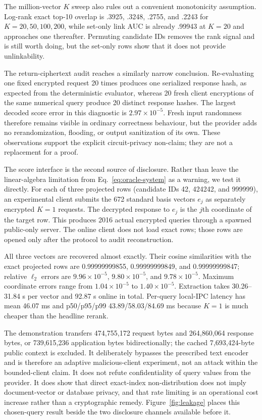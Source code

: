 \documentclass[pdflatex,sn-basic,Numbered]{sn-jnl}
\theoremstyle{plain}
\begin{document}
The million-vector $K$ sweep also rules out a convenient monotonicity assumption. Log-rank exact top-10 overlap is .3925, .3248, .2755, and .2243 for $K=20,50,100,200$, while set-only link AUC is already .99943 at $K=20$ and approaches one thereafter. Permuting candidate IDs removes the rank signal and is still worth doing, but the set-only rows show that it does not provide unlinkability.

The return-ciphertext audit reaches a similarly narrow conclusion. Re-evaluating one fixed encrypted request 20 times produces one serialized response hash, as expected from the deterministic evaluator, whereas 20 fresh client encryptions of the same numerical query produce 20 distinct response hashes. The largest decoded score error in this diagnostic is $2.97\times10^{-5}$. Fresh input randomness therefore remains visible in ordinary correctness behaviour, but the provider adds no rerandomization, flooding, or output sanitization of its own. These observations support the explicit circuit-privacy non-claim; they are not a replacement for a proof.

The score interface is the second source of disclosure.\label{subsec:oracle-results} Rather than leave the linear-algebra limitation from Eq.~\eqref{eq:oracle-system} as a warning, we test it directly. For each of three projected rows (candidate IDs 42, 424242, and 999999), an experimental client submits the 672 standard basis vectors $e_j$ as separately encrypted $K=1$ requests. The decrypted response to $e_j$ is the $j$th coordinate of the target row. This produces 2016 actual encrypted queries through a spawned public-only server. The online client does not load exact rows; those rows are opened only after the protocol to audit reconstruction.

All three vectors are recovered almost exactly. Their cosine similarities with the exact projected rows are 0.99999999855, 0.99999999849, and 0.99999999847; relative $\ell_2$ errors are $9.96\times10^{-5}$, $9.80\times10^{-5}$, and $9.78\times10^{-5}$. Maximum coordinate errors range from $1.04\times10^{-5}$ to $1.40\times10^{-5}$. Extraction takes 30.26--31.84 s per vector and 92.87 s online in total. Per-query local-IPC latency has mean 46.07 ms and p50/p95/p99 43.89/58.03/84.69 ms because $K=1$ is much cheaper than the headline rerank.

The demonstration transfers 474,755,172 request bytes and 264,860,064 response bytes, or 739,615,236 application bytes bidirectionally; the cached 7,693,424-byte public context is excluded. It deliberately bypasses the prescribed text encoder and is therefore an adaptive malicious-client experiment, not an attack within the bounded-client claim. It does not refute confidentiality of query values from the provider. It does show that direct exact-index non-distribution does not imply document-vector or database privacy, and that rate limiting is an operational cost increase rather than a cryptographic remedy. Figure~\ref{fig:leakage} places this chosen-query result beside the two disclosure channels available before it.
\end{document}
